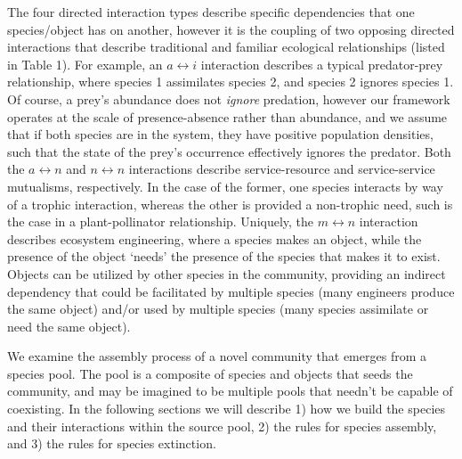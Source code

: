 \documentclass[twocolumn,preprintnumbers,amsmath,amssymb,superscriptaddress]{revtex4}
\begin{document}
The four directed interaction types describe specific dependencies that one species/object has on another, however it is the coupling of two opposing directed interactions that describe traditional and familiar ecological relationships (listed in Table 1).
For example, an $a \leftrightarrow i$ interaction describes a typical predator-prey relationship, where species 1 assimilates species 2, and species 2 ignores species 1.
Of course, a prey's abundance does not \emph{ignore} predation, however our framework operates at the scale of presence-absence rather than abundance, and we assume that if both species are in the system, they have positive population densities, such that the state of the prey's occurrence effectively ignores the predator.
Both the $a \leftrightarrow n$ and $n \leftrightarrow n$ interactions describe service-resource and service-service mutualisms, respectively.
In the case of the former, one species interacts by way of a trophic interaction, whereas the other is provided a non-trophic need, such is the case in a plant-pollinator relationship.
Uniquely, the $m \leftrightarrow n$ interaction describes ecosystem engineering, where a species makes an object, while the presence of the object `needs' the presence of the species that makes it to exist.
Objects can be utilized by other species in the community, providing an indirect dependency that could be facilitated by multiple species (many engineers produce the same object) and/or used by multiple species (many species assimilate or need the same object).

We examine the assembly process of a novel community that emerges from a species pool.
The pool is a composite of species and objects that seeds the community, and may be imagined to be multiple pools that needn't be capable of coexisting.
In the following sections we will describe
1) how we build the species and their interactions within the source pool,
2) the rules for species assembly, and 
3) the rules for species extinction.
\end{document}
